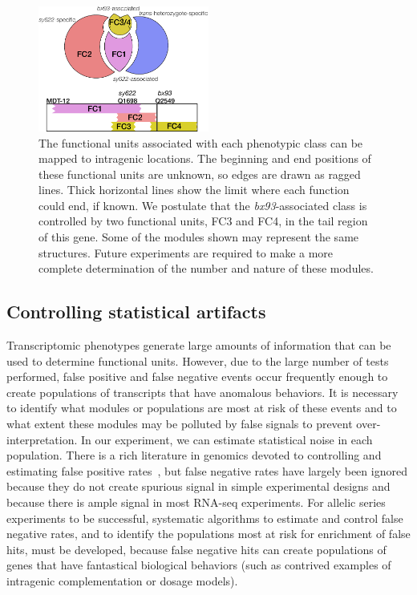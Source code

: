 \documentclass[10pt, twocolumn]{article}
\begin{document}
\begin{figure}
  \centering{}
  \includegraphics[width=0.5\textwidth]{../figs/inferred_domains.pdf}
  \caption{
    The functional units associated with each phenotypic class can be
    mapped to intragenic locations. The beginning and end positions of
    these functional units are unknown,
    so edges are drawn as ragged lines. Thick horizontal lines show the
    limit where each function could end, if known. We postulate that the
    \emph{bx93}-associated class is controlled by two functional units, FC3 and
    FC4, in the tail region of this gene. Some of the modules shown may
    represent the same structures. Future experiments are required to make a more
    complete determination of the number and nature of these modules.
  }
\label{fig:domains}
\end{figure}


\subsection*{Controlling statistical artifacts}
Transcriptomic phenotypes generate large amounts of information that can be used
to determine functional units. However, due to the large number
of tests performed, false positive and false negative events occur frequently
enough to create populations of transcripts that have anomalous behaviors. It is
necessary to identify what modules or populations are most at risk of these
events and to what extent these modules may be polluted by false signals to
prevent over-interpretation. In our experiment, we can estimate statistical noise
in each population. There is a rich literature in genomics devoted to controlling and
estimating false positive rates~\cite{}, but false negative rates have largely
been ignored because they do not create spurious signal in simple experimental
designs and because there is ample signal in most RNA-seq experiments.
For allelic series experiments to be successful, systematic
algorithms to estimate and control false negative rates, and to identify
the populations most at risk for enrichment of false hits, must be developed,
because false negative hits can create populations of genes that have fantastical
biological behaviors (such as contrived examples of intragenic complementation
or dosage models).
\end{document}
